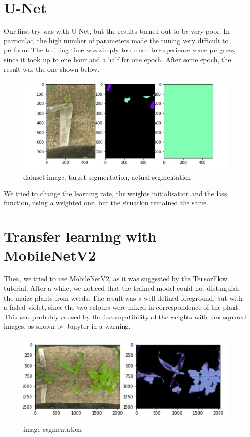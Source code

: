 \documentclass[12pt,a4paper]{report}
\begin{document}
		\section{U-Net}
Our first try was with U-Net, but the results turned out to be very poor. In particular, the high number of parameters made the tuning very difficult to perform. The training time was simply too much to experience some progress, since it took up to one hour and a half for one epoch. After some epoch, the result was the one shown below. 
\begin{figure}[H]
	\includegraphics[scale = .75, center]{U_Net}
	\caption{dataset image, target segmentation, actual segmentation}
\end{figure}
	
We tried to change the learning rate, the weights initialization and the loss function, using a weighted one, but the situation remained the same.	
		
		\section{Transfer learning with MobileNetV2}
Then, we tried to use MobileNetV2, as it was suggested by the TensorFlow tutorial. After a while, we noticed that the trained model could not distinguish the maize plants from weeds. The result was a well defined foreground, but with a faded violet, since the two colours were mixed in correspondence of the plant.  This was probably caused by the incompatibility of the weights with non-squared images, as shown by Jupyter in a warning. 
	

\begin{figure}[H]
	\includegraphics[scale = 1.2, center]{MobileNetV2}
	\caption{image segmentation}
\end{figure}
\end{document}
